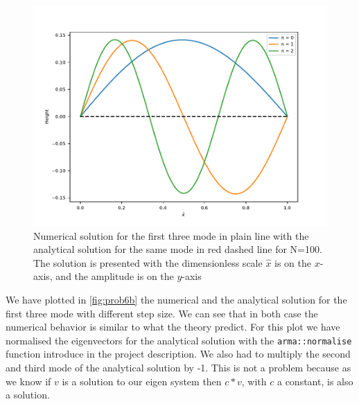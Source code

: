 \documentclass[a4paper,10pt,english]{article}
\begin{document}
			\begin{figure}[ht]
				\centering
				\includegraphics[width=1.0\linewidth]{figures/prob_6b.pdf}
				\caption{Numerical solution for the first three mode in plain line with the analytical solution for the same mode in red dashed line for N=100. The solution is presented with the dimensionless scale $\hat{x}$ is on the $x$-axis, and the amplitude is on the $y$-axis\label{fig:prob6b}}
			\end{figure}
		
		We have plotted in \autoref{fig:prob6b} the numerical and the analytical solution for the first three mode with different step size. We can see that in both case the numerical behavior is similar to what the theory predict. For this plot we have normalised the eigenvectors for the analytical solution with the \lstinline{arma::normalise} function introduce in the project description. We also had to multiply the second and third mode of the analytical solution by -1. This is not a problem because as we know if $v$ is a solution to our eigen system then $c*v$, with $c$ a constant, is also a solution.


\printbibliography[heading=bibintoc, title={References}]
\end{document}
